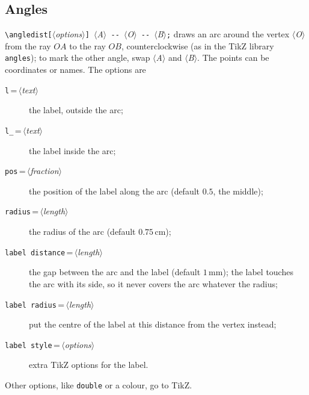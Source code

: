 \documentclass[a4paper,11pt]{article}
\newcommand\key[1]{\texttt{#1}}
\newcommand\meta[1]{\ensuremath{\langle}\textit{#1}\ensuremath{\rangle}}
\begin{document}
\subsection{Angles}
\verb|\angledist[|\meta{options}\verb|] |\meta{A}\verb| -- |\meta{O}\verb| -- |\meta{B}\verb|;|
draws an arc around the vertex \meta{O} from the ray \(OA\) to the ray
\(OB\), counterclockwise (as in the TikZ library \texttt{angles}); to mark
the other angle, swap \meta{A} and \meta{B}. The points can be coordinates
or names. The options are
\begin{description}
  \item[\key{l}\,=\,\meta{text}] the label, outside the arc;
  \item[\key{l\_}\,=\,\meta{text}] the label inside the arc;
  \item[\key{pos}\,=\,\meta{fraction}] the position of the label along the
    arc (default \(0.5\), the middle);
  \item[\key{radius}\,=\,\meta{length}] the radius of the arc (default
    \(0.75\,\mathrm{cm}\));
  \item[\key{label distance}\,=\,\meta{length}] the gap between the arc and
    the label (default \(1\,\mathrm{mm}\)); the label touches the arc with
    its side, so it never covers the arc whatever the radius;
  \item[\key{label radius}\,=\,\meta{length}] put the centre of the label at
    this distance from the vertex instead;
  \item[\key{label style}\,=\,\meta{options}] extra TikZ options for the
    label.
\end{description}
Other options, like \key{double} or a colour, go to TikZ.
\begin{example}
\end{example}
\begin{example}
\end{example}
\end{document}
